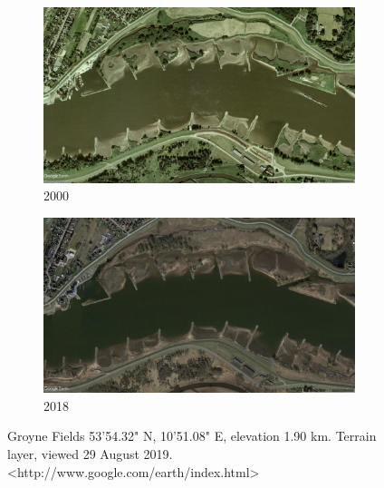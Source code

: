 \begin{figure}[!ht]
\centering
\begin{subfigure}{0.49\textwidth}
  \centering
  \includegraphics[width=0.9\linewidth]{../images/introduction/sat2000.jpg}
  \caption{2000}
  \label{fig:sat2000}
\end{subfigure}%
\begin{subfigure}{.49\textwidth}
  \centering
  \includegraphics[width=0.9\linewidth]{../images/introduction/sat2018.jpg}
  \caption{2018}
  \label{fig:sat2018}
\end{subfigure}
\caption{Groyne Fields 53'54.32" N,  10'51.08" E, elevation 1.90 km. Terrain layer, viewed 29 August 2019. <http://www.google.com/earth/index.html>}
\label{fig:satelliteImage}
\end{figure}

